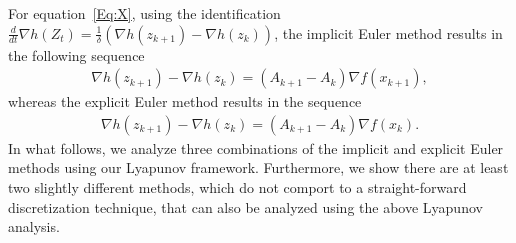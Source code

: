 \documentclass[11pt]{article}
\theoremstyle{plain}
\begin{document}
 For equation~\eqref{Eq:X}, using the identification $\frac{d}{dt} \nabla h(Z_t) = \frac{1}{\delta}(\nabla h(z_{k+1}) - \nabla h(z_k))$, the implicit Euler method results in the following sequence
 \begin{align*}
\nabla h(z_{k+1}) - \nabla h(z_k) = (A_{k+1} - A_k) \nabla f(x_{k+1}),
 \end{align*}
 whereas the explicit Euler method results in the sequence
 \begin{align*}
\nabla h(z_{k+1}) - \nabla h(z_k) = (A_{k+1} - A_k) \nabla f(x_{k}).
 \end{align*}
 In what follows, we analyze three combinations of the implicit and explicit Euler methods using our Lyapunov framework. Furthermore, we show there are at least two slightly different methods, which do not comport to a straight-forward discretization technique, that can also be analyzed using the above Lyapunov analysis. 
\end{document}
